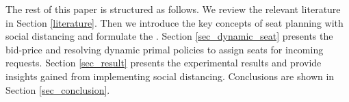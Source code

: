 The rest of this paper is structured as follows. We review the relevant literature in Section \ref{literature}. Then we introduce the key concepts of seat planning with social distancing and formulate the . Section \ref{sec_dynamic_seat} presents the bid-price and resolving dynamic primal policies to assign seats for incoming requests. Section \ref{sec_result} presents the experimental results and provide insights gained from implementing social distancing. Conclusions are shown in Section \ref{sec_conclusion}.

